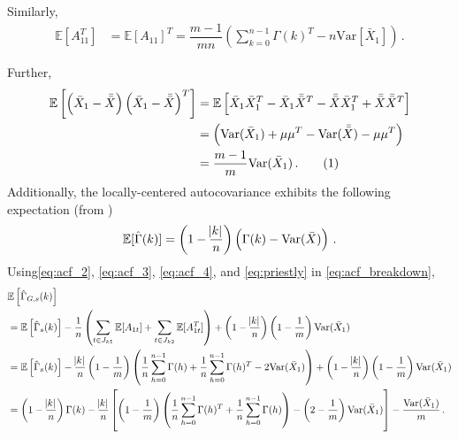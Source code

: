 \documentclass[11pt]{article}
\newcommand{\E}{\mathbb{E}}
\newcommand{\Var}{\text{Var}}
\newcommand\numberthis{\addtocounter{equation}{1}\tag{\theequation}}
\theoremstyle{remark}
\begin{document}
%
Similarly,
%    
\begin{align}
\label{eq:acf_3}
    \mathbb{E} \left[ A_{11}^T \right] &= \mathbb{E}\left[ A_{11}\right]^T = \dfrac{m-1}{mn}\left(\sum_{k=0}^{n-1}\Gamma(k)^T - n\text{Var}\left[\bar{X}_1 \right] \right)\,.
\end{align}


Further,
\begin{align*}
\mathbb{E}\left[ \left(\bar{X}_{1} - \bar{\bar{X}} \right)  \left(\bar{X}_{1} - \bar{\bar{X}} \right)^{T}\right] &= \mathbb{E}\left[ \bar{X}_{1}\bar{X}_{1}^{T} - \bar{X}_{1}\bar{\bar{X}}^{T} - \bar{\bar{X}} \bar{X}_{1}^{T} + \bar{\bar{X}}\bar{\bar{X}}^{T}\right]\\
&= \left(\Var(\bar{X}_{1}) + \mu\mu^{T} - \Var(\bar{\bar{X}}) - \mu\mu^{T}\right)\\
&= \dfrac{m-1}{m}\Var(\bar{X}_1)\,. \numberthis \label{eq:acf_4}
\end{align*}
%
Additionally, the locally-centered autocovariance exhibits the following expectation (from \cite{priestley1981spectral})
 \begin{equation} \label{eq:priestly}
     \mathbb{E}[\hat{\Gamma}(k)] = \left(1- \dfrac{\abs{k}}{n}\right)\left(\Gamma(k) - \Var{(\bar{X})}
 \right)\,.
 \end{equation}
%
Using\eqref{eq:acf_2}, \eqref{eq:acf_3}, \eqref{eq:acf_4}, and  \eqref{eq:priestly} in \eqref{eq:acf_breakdown},
\begin{align*}
    & \E \left[\hat{\Gamma}_{G,s}(k) \right] \\
    &= \mathbb{E}\left[\hat{\Gamma}_{s}(k)\right] - \dfrac{1}{n} \left(\sum\limits_{t \in J_{k1}}\mathbb{E}[A_{1t}] + \sum\limits_{t \in J_{k2}}\mathbb{E}[A_{1t}^T] \right) + \left(1- \dfrac{\abs{k}}{n}\right)\left(1-\dfrac{1}{m}\right)\Var(\bar{X}_1)\\
    &= \mathbb{E}\left[\hat{\Gamma}_{s}(k)\right] - \dfrac{\abs{k}}{n}\left(1-\dfrac{1}{m}\right)\left(\dfrac{1}{n}\sum_{h=0}^{n-1}\Gamma(h) + \dfrac{1}{n}\sum_{h=0}^{n-1}\Gamma(h)^T - 2 \Var(\bar{X}_1)\right) + \left(1- \dfrac{\abs{k}}{n}\right)\left(1-\dfrac{1}{m}\right)\Var(\bar{X}_1)\\
    &= \left(1- \dfrac{\abs{k}}{n}\right)\Gamma(k) - \dfrac{\abs{k}}{n}\left[\left(1-\dfrac{1}{m}\right)\left(\dfrac{1}{n}\sum_{h=0}^{n-1}\Gamma(h)^T + \dfrac{1}{n}\sum_{h=0}^{n-1}\Gamma(h)\right) - \left(2-\dfrac{1}{m}\right) \Var(\bar{X}_1)\right] - \dfrac{\Var(\bar{X}_1)}{m}\,.
\end{align*}
%
\end{document}
